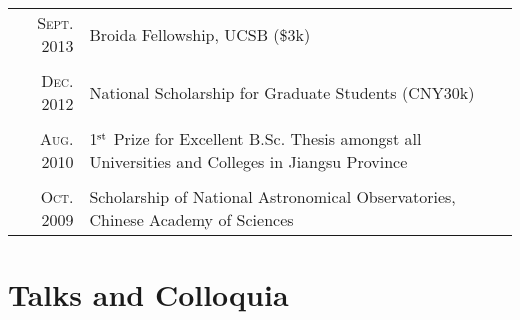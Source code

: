 \documentclass[letterpaper,10pt]{article}
\newcommand{\narrow}{-1.8ex}
\newcommand{\textwrap}{5.8in}       %
\begin{document}
\begin{longtable}{r|p{\textwrap}}
    \textsc{Sept. 2013} & Broida Fellowship, UCSB (\$3k)  \\
    \multicolumn{2}{c}{} \\[\narrow]
    \textsc{Dec. 2012} & National Scholarship for Graduate Students (CNY30k)  \\
    \multicolumn{2}{c}{} \\[\narrow]
    \textsc{Aug. 2010} & 1$^{\rm st}$ Prize for Excellent B.Sc. Thesis amongst all Universities and Colleges in Jiangsu Province \\
    \multicolumn{2}{c}{} \\[\narrow]
    \textsc{Oct. 2009} & Scholarship of National Astronomical Observatories, Chinese Academy of Sciences
\end{longtable}


\vspace*{-.7em}
\section{Talks and Colloquia}
\end{document}
